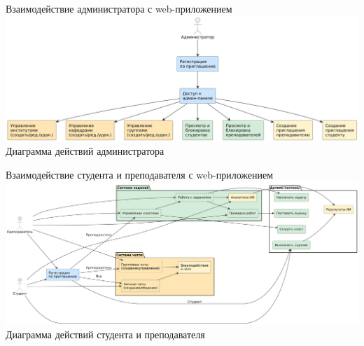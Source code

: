 \documentclass[aspectratio=169]{beamer}
\begin{document}
\begin{frame}{Взаимодействие администратора с web-приложением}
    \centering
    \includegraphics[width=\linewidth]{static/AdminFlowchart.png}
    \vspace{0.5em}
    {\small Диаграмма действий администратора}
\end{frame}

%

\begin{frame}{Взаимодействие студента и преподавателя с web-приложением}
    \centering
    \includegraphics[width=\linewidth]{static/TeacherStudentFlowchart.png}
    \vspace{0.5em}
    {\small Диаграмма действий студента и преподавателя}
\end{frame}

%
%
%
\end{document}
